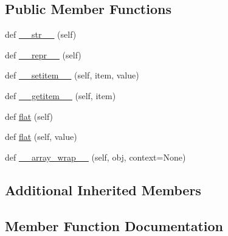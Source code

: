 \subsection*{Public Member Functions}
\begin{DoxyCompactItemize}
\item 
def \hyperlink{classnumpy_1_1ma_1_1tests_1_1test__subclassing_1_1ComplicatedSubArray_a39f77fe0b8d2e1dd3420ed5ee7a8cbf0}{\+\_\+\+\_\+str\+\_\+\+\_\+} (self)
\item 
def \hyperlink{classnumpy_1_1ma_1_1tests_1_1test__subclassing_1_1ComplicatedSubArray_a6c9378e35174df3caa8ddbb1a32aa79a}{\+\_\+\+\_\+repr\+\_\+\+\_\+} (self)
\item 
def \hyperlink{classnumpy_1_1ma_1_1tests_1_1test__subclassing_1_1ComplicatedSubArray_a5be8e51e9509940d59a72706d8515a43}{\+\_\+\+\_\+setitem\+\_\+\+\_\+} (self, item, value)
\item 
def \hyperlink{classnumpy_1_1ma_1_1tests_1_1test__subclassing_1_1ComplicatedSubArray_a71ef55adf79dd5ee79ef2748a8f71a4a}{\+\_\+\+\_\+getitem\+\_\+\+\_\+} (self, item)
\item 
def \hyperlink{classnumpy_1_1ma_1_1tests_1_1test__subclassing_1_1ComplicatedSubArray_a0e40f369a74a6552d60771b90e36a15f}{flat} (self)
\item 
def \hyperlink{classnumpy_1_1ma_1_1tests_1_1test__subclassing_1_1ComplicatedSubArray_a515d21277985f1ec4fc21c52c116439d}{flat} (self, value)
\item 
def \hyperlink{classnumpy_1_1ma_1_1tests_1_1test__subclassing_1_1ComplicatedSubArray_a874007aa13f893da4c328630d90846e1}{\+\_\+\+\_\+array\+\_\+wrap\+\_\+\+\_\+} (self, obj, context=None)
\end{DoxyCompactItemize}
\subsection*{Additional Inherited Members}


\subsection{Member Function Documentation}
\mbox{\label{classnumpy_1_1ma_1_1tests_1_1test__subclassing_1_1ComplicatedSubArray_a874007aa13f893da4c328630d90846e1}} 
